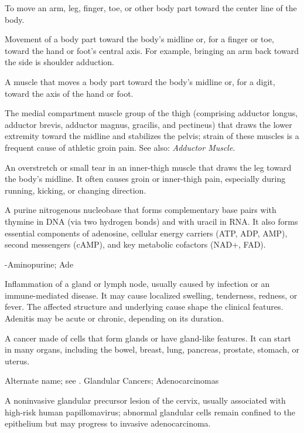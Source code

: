  To move an arm, leg, finger, toe, or other body part toward the center line of the body.

 Movement of a body part toward the body's midline or, for a finger or toe, toward the hand or foot's central axis. For example, bringing an arm back toward the side is shoulder adduction.

 A muscle that moves a body part toward the body’s midline or, for a digit, toward the axis of the hand or foot.

 The medial compartment muscle group of the thigh (comprising adductor longus, adductor brevis, adductor magnus, gracilis, and pectineus) that draws the lower extremity toward the midline and stabilizes the pelvis; strain of these muscles is a frequent cause of athletic groin pain. See also: \textit{Adductor Muscle}.

 An overstretch or small tear in an inner-thigh muscle that draws the leg toward the body's midline. It often causes groin or inner-thigh pain, especially during running, kicking, or changing direction.

 A purine nitrogenous nucleobase that forms complementary base pairs with thymine in DNA (via two hydrogen bonds) and with uracil in RNA. It also forms essential components of adenosine, cellular energy carriers (ATP, ADP, AMP), second messengers (cAMP), and key metabolic cofactors (NAD+, FAD).

-Aminopurine; Ade

 Inflammation of a gland or lymph node, usually caused by infection or an
immune-mediated disease. It may cause localized swelling, tenderness, redness, or fever.
The affected structure and underlying cause shape the clinical features. Adenitis may be
acute or chronic, depending on its duration.

 A cancer made of cells that form glands or have gland-like features. It can start in many organs, including the bowel, breast, lung, pancreas, prostate, stomach, or uterus.

 Alternate name; see .
\synonyms
Glandular Cancers; Adenocarcinomas

 A noninvasive glandular precursor lesion of the cervix, usually associated with high-risk human papillomavirus; abnormal glandular cells remain confined to the epithelium but may progress to invasive adenocarcinoma.

